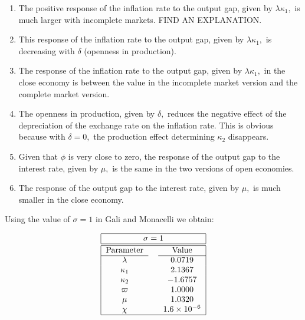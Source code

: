 \documentclass{article}
\begin{document}
\begin{enumerate}
\item The positive response of the inflation rate to the output gap, given
by $\lambda \kappa _{1},$ is much larger with incomplete markets. FIND AN
EXPLANATION.

\item This response of the inflation rate to the output gap, given by $%
\lambda \kappa _{1},$ is decreasing with $\delta $ (openness in production).

\item The response of the inflation rate to the output gap, given by $%
\lambda \kappa _{1},$ in the close economy is between the value in the
incomplete market version and the complete market version.

\item The openness in production, given by $\delta ,$ reduces the negative
effect of the depreciation of the exchange rate on the inflation rate. This
is obvious because with $\delta =0,$ the production effect determining $%
\kappa _{2}$ disappears.

\item Given that $\phi $ is very close to zero, the response of the output
gap to the interest rate, given by $\mu ,$ is the same in the two versions
of open economies.

\item The response of the output gap to the interest rate, given by $\mu ,$
is much smaller in the close economy.
\end{enumerate}

Using the value of $\sigma =1$ in Gali and Monacelli we obtain:

\begin{equation*}
\begin{tabular}{|ccc|}
\hline
\multicolumn{3}{|c|}{$\sigma =1$} \\ \hline\hline
Parameter &  & Value \\ \cline{1-1}\cline{3-3}
$\lambda $ &  & $0.0719$ \\ 
$\kappa _{1}$ &  & $2.1367$ \\ 
$\kappa _{2}$ &  & $-1.6757$ \\ 
$\varpi $ &  & $1.0000$ \\ 
$\mu $ &  & $1.0320$ \\ 
$\chi $ &  & $1.6\times 10^{-6}$ \\ \hline
\end{tabular}%
\end{equation*}
\end{document}
